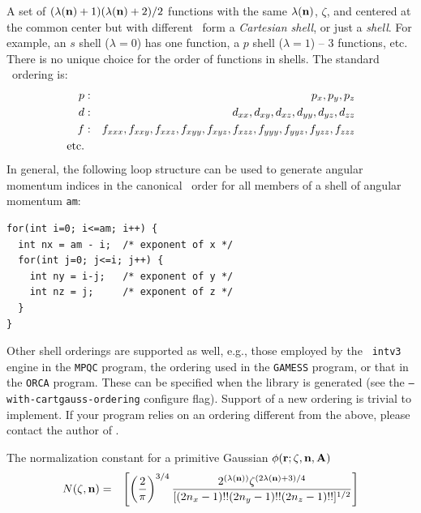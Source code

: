 \documentclass[10pt]{article}
\begin{document}
A set of $(\lambda({\bf n}) + 1)(\lambda({\bf n}) + 2)/2$ functions with the same $\lambda({\bf n})$, $\zeta$, and centered
at the common center
but with different \n\ form a {\em Cartesian shell},
or just a {\em shell}. For example, an $s$ shell ($\lambda=0$) has one function, a $p$ shell ($\lambda=1$) --
3 functions, etc.
There is no unique choice for the order of functions in shells.
The standard \LIBINT\ ordering is:
\begin{eqnarray}
p & : & p_x, p_y, p_z \nonumber \\
d & : & d_{xx}, d_{xy}, d_{xz}, d_{yy}, d_{yz}, d_{zz} \nonumber \\
f & : & f_{xxx}, f_{xxy}, f_{xxz}, f_{xyy}, f_{xyz}, f_{xzz}, f_{yyy}, f_{yyz}, f_{yzz}, f_{zzz} \nonumber \\
{\rm etc.} \nonumber
\end{eqnarray}
In general, the following loop structure can be used to generate angular momentum indices in the canonical \LIBINT\ order for all
members of a shell of angular momentum {\tt am}:
\begin{verbatim}
for(int i=0; i<=am; i++) {
  int nx = am - i;  /* exponent of x */
  for(int j=0; j<=i; j++) {
    int ny = i-j;   /* exponent of y */
    int nz = j;     /* exponent of z */
  }
}
\end{verbatim}
Other shell orderings are supported as well, e.g., those employed by the {\tt
intv3} engine in the {\tt MPQC} program, the ordering used in the {\tt GAMESS}
program, or that in the {\tt ORCA} program. These can be specified when the
library is generated (see the {\tt --with-cartgauss-ordering} configure flag).
Support of a new ordering is trivial to implement.
If your program relies on an ordering different from the above, please contact the author of \LIBINT .

The normalization constant for a primitive Gaussian $\phi ({\bf r}; \zeta, {\bf n}, {\bf A})$
\begin{eqnarray}
N(\zeta,{\bf n}) & = & \left[ \left(\frac{2}{\pi}\right)^{3/4}\frac{2^{(\lambda({\bf n}))}\zeta^{(2\lambda({\bf n})+3)/4}}
                {[(2n_x-1)!!(2n_y-1)!!(2n_z-1)!!]^{1/2}} \right]
\end{eqnarray}
\end{document}
